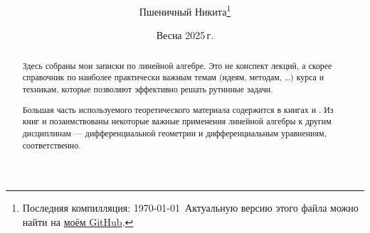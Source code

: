 \documentclass[a4paper, twoside, leqno, 11pt]{article}
\begin{document}
\title{\bfseries\scshape\course}
\date{Весна 2025\,г.}
\author{Пшеничный Никита\thanks{Последняя компилляция: \today\ Актуальную версию этого файла можно найти на \href{https://github.com/pshenikita/Linear-Algebra}{моём GitHub}.}}

\maketitle
\begin{abstract}
	Здесь собраны мои записки по линейной алгебре. Это не конспект лекций, а скорее справочник по наиболее практически важным темам (идеям, методам, \ldots) курса и техникам, которые позволяют эффективно решать рутинные задачи.

	Большая часть используемого теоретического материала содержится в книгах \cite{P24} и \cite{V24}. Из книг \cite{NT14} и \cite{A24} позаимствованы некоторые важные применения линейной алгебры к другим дисциплинам --- дифференциальной геометрии и дифференциальным уравнениям, соответственно.

	
\end{abstract}

\tableofcontents



\end{document}
